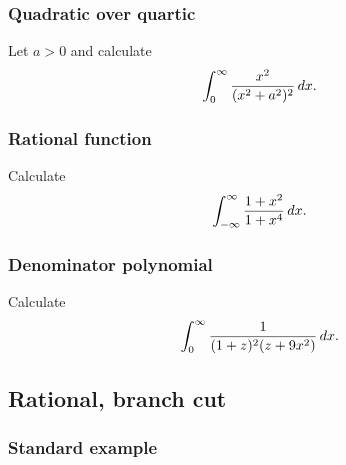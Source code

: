 \hypertarget{quadratic-over-quartic}{%
\subsubsection{Quadratic over quartic}\label{quadratic-over-quartic}}

\begin{problem}[?]

Let \(a>0\) and calculate
\begin{align*}
\int_0^\infty {x^2 \over (x^2 + a^2)^2} \, dx
.\end{align*}

\end{problem}

\hypertarget{rational-function}{%
\subsubsection{Rational function}\label{rational-function}}

\begin{problem}[?]

Calculate
\begin{align*}
\int_{-\infty}^\infty {1+x^2 \over 1+x^4}\, dx
.\end{align*}

\end{problem}

\hypertarget{denominator-polynomial}{%
\subsubsection{Denominator polynomial}\label{denominator-polynomial}}

\begin{problem}[?]

Calculate
\begin{align*}
\int_0^\infty {1 \over (1+z)^2 (z+9x^2)} \, dx
.\end{align*}

\end{problem}

\hypertarget{rational-branch-cut}{%
\subsection{Rational, branch cut}\label{rational-branch-cut}}

\hypertarget{standard-example}{%
\subsubsection{Standard example}\label{standard-example}}

